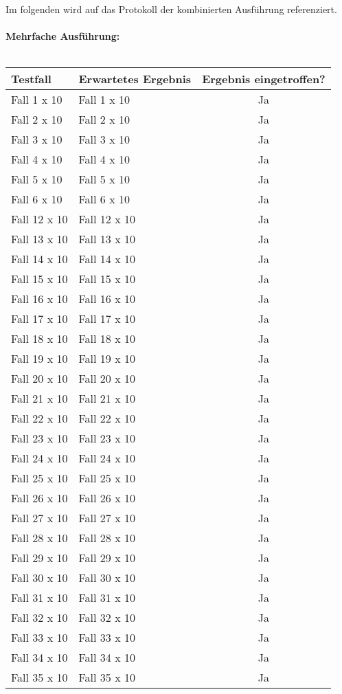 \newpage
Im folgenden wird auf das Protokoll der kombinierten Ausführung referenziert.\ \\ \\
\textbf{Mehrfache Ausführung:}\ \\ \\
\begin{tabular}[c]{|p{6cm}|p{6cm}|c|}
\hline
\textbf{Testfall} & \textbf{Erwartetes Ergebnis} & \textbf{Ergebnis eingetroffen?}\\
\hline
Fall 1 x 10 & Fall 1 x 10 & Ja\\
\hline
Fall 2 x 10 & Fall 2 x 10 & Ja\\
\hline
Fall 3 x 10 & Fall 3 x 10 & Ja\\
\hline
Fall 4 x 10 & Fall 4 x 10 & Ja\\
\hline
Fall 5 x 10 & Fall 5 x 10 & Ja\\
\hline
Fall 6 x 10 & Fall 6 x 10 & Ja\\
\hline
Fall 12 x 10 & Fall 12 x 10 & Ja\\
\hline
Fall 13 x 10 & Fall 13 x 10 & Ja\\
\hline
Fall 14 x 10 & Fall 14 x 10 & Ja\\
\hline
Fall 15 x 10 & Fall 15 x 10 & Ja\\
\hline
Fall 16 x 10 & Fall 16 x 10 & Ja\\
\hline
Fall 17 x 10 & Fall 17 x 10 & Ja\\
\hline
Fall 18 x 10 & Fall 18 x 10 & Ja\\
\hline
Fall 19 x 10 & Fall 19 x 10 & Ja\\
\hline
Fall 20 x 10 & Fall 20 x 10 & Ja\\
\hline
Fall 21 x 10 & Fall 21 x 10 & Ja\\
\hline
Fall 22 x 10 & Fall 22 x 10 & Ja\\
\hline
Fall 23 x 10 & Fall 23 x 10 & Ja\\
\hline
Fall 24 x 10 & Fall 24 x 10 & Ja\\
\hline
Fall 25 x 10 & Fall 25 x 10 & Ja\\
\hline
Fall 26 x 10 & Fall 26 x 10 & Ja\\
\hline
Fall 27 x 10 & Fall 27 x 10 & Ja\\
\hline
Fall 28 x 10 & Fall 28 x 10 & Ja\\
\hline 
Fall 29 x 10 & Fall 29 x 10 & Ja\\
\hline
Fall 30 x 10 & Fall 30 x 10 & Ja\\
\hline
Fall 31 x 10 & Fall 31 x 10 & Ja\\
\hline
Fall 32 x 10 & Fall 32 x 10 & Ja\\
\hline
Fall 33 x 10 & Fall 33 x 10 & Ja\\
\hline
Fall 34 x 10 & Fall 34 x 10 & Ja\\
\hline
Fall 35 x 10 & Fall 35 x 10 & Ja\\
\hline
\end{tabular}
